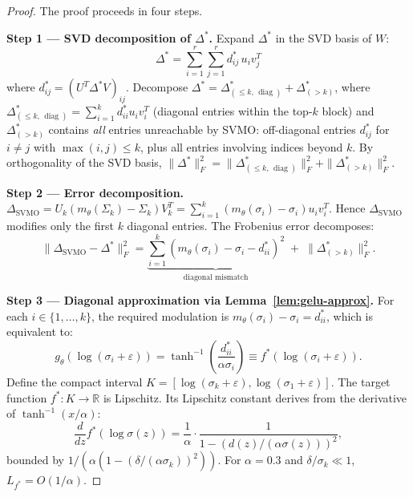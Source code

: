 \documentclass[conference]{IEEEtran}
\newcommand{\RR}{\mathbb{R}}
\newcommand{\diag}{\operatorname{diag}}
\begin{document}
\begin{proof}
The proof proceeds in four steps.

\textbf{Step 1 --- SVD decomposition of $\Delta^*$.}
Expand $\Delta^*$ in the SVD basis of $W$:
\begin{equation}
\Delta^* = \sum_{i=1}^r \sum_{j=1}^r d_{ij}^* \, u_i v_j^T
\end{equation}
where $d_{ij}^* = (U^T \Delta^* V)_{ij}$. Decompose $\Delta^* = \Delta^*_{(\leq k,\, \diag)} + \Delta^*_{(>k)}$, where $\Delta^*_{(\leq k,\, \diag)} = \sum_{i=1}^k d_{ii}^* u_i v_i^T$ (diagonal entries within the top-$k$ block) and $\Delta^*_{(>k)}$ contains \textit{all} entries unreachable by SVMO: off-diagonal entries $d_{ij}^*$ for $i \neq j$ with $\max(i,j) \leq k$, plus all entries involving indices beyond $k$. By orthogonality of the SVD basis, $\|\Delta^*\|_F^2 = \|\Delta^*_{(\leq k,\, \diag)}\|_F^2 + \|\Delta^*_{(>k)}\|_F^2$.

\textbf{Step 2 --- Error decomposition.}
$\Delta_{\text{SVMO}} = U_k(m_\theta(\Sigma_k) - \Sigma_k)V_k^T = \sum_{i=1}^k (m_\theta(\sigma_i) - \sigma_i) u_i v_i^T$. Hence $\Delta_{\text{SVMO}}$ modifies only the first $k$ diagonal entries. The Frobenius error decomposes:
\begin{equation}
\|\Delta_{\text{SVMO}} - \Delta^*\|_F^2 = \underbrace{\sum_{i=1}^k (m_\theta(\sigma_i) - \sigma_i - d_{ii}^*)^2}_{\text{diagonal mismatch}} \;+\; \|\Delta^*_{(>k)}\|_F^2.
\end{equation}

\textbf{Step 3 --- Diagonal approximation via Lemma~\ref{lem:gelu-approx}.}
For each $i \in \{1,\dots,k\}$, the required modulation is $m_\theta(\sigma_i) - \sigma_i = d_{ii}^*$, which is equivalent to:
\begin{equation}
g_\theta(\log(\sigma_i + \varepsilon)) = \tanh^{-1}\!\left(\frac{d_{ii}^*}{\alpha\sigma_i}\right) \equiv f^*(\log(\sigma_i + \varepsilon)).
\end{equation}
Define the compact interval $K = [\log(\sigma_k + \varepsilon), \log(\sigma_1 + \varepsilon)]$. The target function $f^*: K \to \RR$ is Lipschitz. Its Lipschitz constant derives from the derivative of $\tanh^{-1}(x/\alpha)$:
\begin{equation}
\frac{d}{dz}f^*(\log\sigma(z)) = \frac{1}{\alpha} \cdot \frac{1}{1-(d(z)/(\alpha\sigma(z)))^2},
\end{equation}
bounded by $1/(\alpha(1-(\delta/(\alpha\sigma_k))^2))$. For $\alpha=0.3$ and $\delta/\sigma_k \ll 1$, $L_{f^*} = O(1/\alpha)$.


\end{proof}
\end{document}
